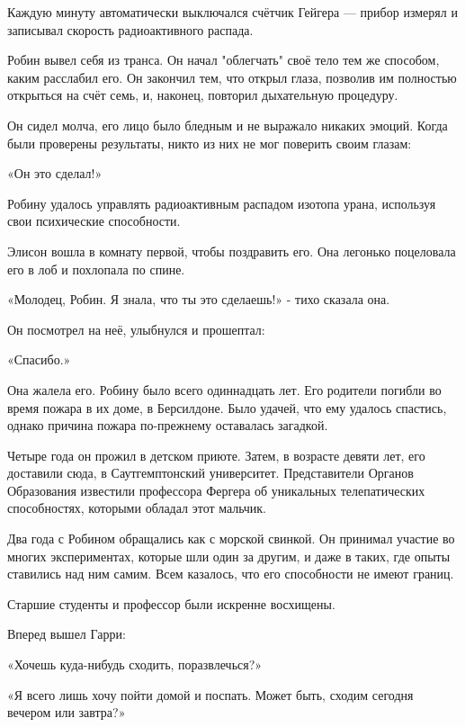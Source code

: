 \documentclass[a4paper,12pt]{book}
\begin{document}
\par
Каждую минуту автоматически выключался счётчик Гейгера — прибор измерял и записывал скорость радиоактивного распада.\\
\par
Робин вывел себя из транса. Он начал "облегчать" своё тело тем же способом, каким расслабил его. Он закончил тем, что открыл глаза, позволив им полностью открыться на счёт семь, и, наконец, повторил дыхательную процедуру.
\par
Он сидел молча, его лицо было бледным и не выражало никаких эмоций. Когда были проверены результаты, никто из них не мог поверить своим глазам:\\
\par
«Он это сделал!»\\
\par
Робину удалось управлять радиоактивным распадом изотопа урана, используя свои психические способности.
\par
Элисон вошла в комнату первой, чтобы поздравить его. Она легонько поцеловала его в лоб и похлопала по спине.
\par
«Молодец, Робин. Я знала, что ты это сделаешь!» - тихо сказала она.\\
\par
Он посмотрел на неё, улыбнулся и прошептал:
\par
«Спасибо.»
\par
Она жалела его. Робину было всего одиннадцать лет. Его родители погибли во время пожара в их доме, в Берсилдоне. Было удачей, что ему удалось спастись, однако причина пожара по-прежнему оставалась загадкой.
\par
Четыре года он прожил в детском приюте. Затем, в возрасте девяти лет, его доставили сюда, в Саутгемптонский университет. Представители Органов Образования известили профессора Фергера об уникальных телепатических способностях, которыми обладал этот мальчик.
\par
Два года с Робином обращались как с морской свинкой. Он принимал участие во многих экспериментах, которые шли один за другим, и даже в таких, где опыты ставились над ним самим. Всем казалось, что его способности не имеют границ.\\
\par
Старшие студенты и профессор были искренне восхищены.
\par
Вперед вышел Гарри:
\par
«Хочешь куда-нибудь сходить, поразвлечься?»
\par
«Я всего лишь хочу пойти домой и поспать. Может быть, сходим сегодня вечером или завтра?»
\end{document}
